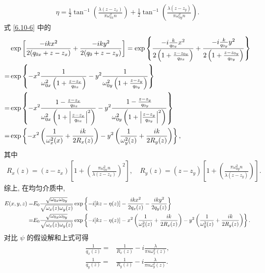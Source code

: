 \documentclass[twoside]{note}
\begin{document}
\begin{pf}
\begin{gather}
        \eta=\frac{1}{2}\tan^{-1}\left(\frac{\lambda(z-z_x)}{\pi\omega_{0x}^2n}\right)+\frac{1}{2}\tan^{-1}\left(\frac{\lambda(z-z_y)}{\pi\omega_{0y}^2n}\right).
    \end{gather}
    式 \eqref{6.10-6} 中的
    \begin{align}
        \notag&\exp\left[\frac{-ikx^2}{2(q_{0x}+z-z_x)}+\frac{-iky^2}{2(q_0+z-z_y)}\right]=\exp\left\{\frac{-i\frac{k}{q_{0x}}x^2}{2\left(1+\frac{z-z_{0x}}{q_{0x}}\right)}+\frac{-i\frac{k}{q_{0y}}y^2}{2\left(1+\frac{z-z_{0y}}{q_{0y}}\right)}\right\}\\
        \notag=&\exp\left\{-x^2\frac{1}{\omega_{0x}^2\left(1+\frac{z-z_x}{q_{0x}}\right)}-y^2\frac{1}{\omega_{0y}^2\left(1+\frac{z-z_y}{q_{0y}}\right)}\right\}\\
        \notag=&\exp\left\{-x^2\frac{1-\frac{z-z_x}{q_{0x}}}{\omega_{0x}^2\left(1+\left\lvert\frac{z-z_x}{q_{0x}}\right\rvert^2\right)}-y^2\frac{1-\frac{z-z_y}{q_{0y}}}{\omega_{0y}^2\left(1+\left\lvert\frac{z-z_y}{q_{0y}}\right\rvert^2\right)}\right\}\\
        =&\exp\left\{-x^2\left(\frac{1}{\omega_x^2(x)}+\frac{ik}{2R_x(z)}\right)-y^2\left(\frac{1}{\omega_y^2(z)}+\frac{ik}{2R_y(z)}\right)\right\},
    \end{align}
    其中
    \begin{align}
        R_x(z)=(z-z_x)\left[1+\left(\frac{\pi\omega_{0x}^2n}{\lambda(z-z_x)}\right)^2\right],\quad R_y(z)=(z-z_y)\left[1+\left(\frac{\pi\omega_{0y}^2n}{\lambda(z-z_y)}\right)\right].
    \end{align}
    综上, 在均匀介质中,
    \begin{align}
        \notag E(x,y,z)=&E_0\frac{\sqrt{\omega_{0x}\omega_{0y}}}{\sqrt{\omega_x(z)\omega_y(z)}}\exp\left\{-i[kz-\eta(z)]-\frac{ikx^2}{2q_x(z)}-\frac{iky^2}{2q_y(z)}\right\}\\
        =&E_0\frac{\sqrt{\omega_{0x}\omega_{0y}}}{\sqrt{\omega_x(z)\omega_y(z)}}\exp\left\{-i[kz-\eta(z)]-x^2\left(\frac{1}{\omega_x^2(z)}+\frac{ik}{2R_x(z)}\right)-y^2\left(\frac{1}{\omega_y^2(z)}+\frac{ik}{2R_y(z)}\right)\right\}.
    \end{align}
    对比 $\psi$ 的假设解和上式可得
    \begin{align}
        \frac{1}{q_x(z)}=&\frac{1}{R_x(z)}-i\frac{\lambda}{\pi n\omega_x^2(z)},\\
        \frac{1}{q_y(z)}=&\frac{1}{R_y(z)}-i\frac{\lambda}{\pi n\omega_y^2(z)}.
    \end{align}


\end{pf}
\end{document}
